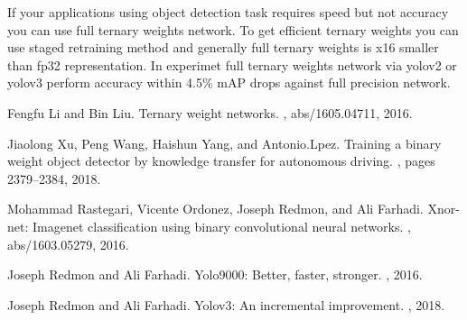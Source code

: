 \documentclass[10pt,a4paper,twocolumn]{article}
\begin{document}
If your applications using object detection task requires speed but not accuracy you can use full ternary weights network.
To get efficient ternary weights you can use staged retraining method and generally full ternary weights is x16 smaller than fp32 representation.
In experimet full ternary weights network via yolov2 or yolov3 perform accuracy within 4.5\% mAP drops against full precision network.

\begin{thebibliography}{1}

Fengfu Li and Bin Liu.
\newblock Ternary weight networks.
, abs/1605.04711, 2016.

Jiaolong Xu, Peng Wang, Haishun Yang, and Antonio.Lpez.
\newblock Training a binary weight object detector by knowledge transfer for
  autonomous driving.
, pages 2379--2384, 2018.

Mohammad Rastegari, Vicente Ordonez, Joseph Redmon, and Ali Farhadi.
\newblock Xnor-net: Imagenet classification using binary convolutional neural
  networks.
, abs/1603.05279, 2016.

Joseph Redmon and Ali Farhadi.
\newblock Yolo9000: Better, faster, stronger.
, 2016.

Joseph Redmon and Ali Farhadi.
\newblock Yolov3: An incremental improvement.
, 2018.

\end{thebibliography}
\end{document}
